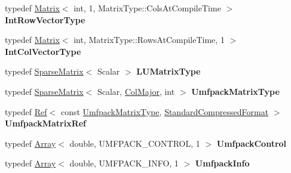 \begin{DoxyCompactItemize}
typedef \hyperlink{group___core___module_class_eigen_1_1_matrix}{Matrix}$<$ int, 1, Matrix\+Type\+::\+Cols\+At\+Compile\+Time $>$ {\bfseries Int\+Row\+Vector\+Type}
\item 
\mbox{\label{class_eigen_1_1_umf_pack_l_u_ac0bc3049980785317785bbe428a4e2e9}} 
typedef \hyperlink{group___core___module_class_eigen_1_1_matrix}{Matrix}$<$ int, Matrix\+Type\+::\+Rows\+At\+Compile\+Time, 1 $>$ {\bfseries Int\+Col\+Vector\+Type}
\item 
\mbox{\label{class_eigen_1_1_umf_pack_l_u_acc3edb274787854495c951c4e05a9265}} 
typedef \hyperlink{group___sparse_core___module_class_eigen_1_1_sparse_matrix}{Sparse\+Matrix}$<$ Scalar $>$ {\bfseries L\+U\+Matrix\+Type}
\item 
\mbox{\label{class_eigen_1_1_umf_pack_l_u_ad00daeabee40de549ce6a03de88ddb33}} 
typedef \hyperlink{group___sparse_core___module_class_eigen_1_1_sparse_matrix}{Sparse\+Matrix}$<$ Scalar, \hyperlink{group__enums_ggaacded1a18ae58b0f554751f6cdf9eb13a0cbd4bdd0abcfc0224c5fcb5e4f6669a}{Col\+Major}, int $>$ {\bfseries Umfpack\+Matrix\+Type}
\item 
\mbox{\label{class_eigen_1_1_umf_pack_l_u_adf053e553c6f76bb02f4402b5f94140a}} 
typedef \hyperlink{group___core___module_class_eigen_1_1_ref}{Ref}$<$ const \hyperlink{group___sparse_core___module}{Umfpack\+Matrix\+Type}, \hyperlink{namespace_eigen_a668ffb0fb66c55c1c98bd35c52df648eaf81fc519ed9cc0ebc6aac69a366086a5}{Standard\+Compressed\+Format} $>$ {\bfseries Umfpack\+Matrix\+Ref}
\item 
\mbox{\label{class_eigen_1_1_umf_pack_l_u_a69a586a34ae369164d464c5551bcce73}} 
typedef \hyperlink{group___core___module_class_eigen_1_1_array}{Array}$<$ double, U\+M\+F\+P\+A\+C\+K\+\_\+\+C\+O\+N\+T\+R\+OL, 1 $>$ {\bfseries Umfpack\+Control}
\item 
\mbox{\label{class_eigen_1_1_umf_pack_l_u_a4d5a177b46684f13e132768f27723382}} 
typedef \hyperlink{group___core___module_class_eigen_1_1_array}{Array}$<$ double, U\+M\+F\+P\+A\+C\+K\+\_\+\+I\+N\+FO, 1 $>$ {\bfseries Umfpack\+Info}
\item 

\end{DoxyCompactItemize}
